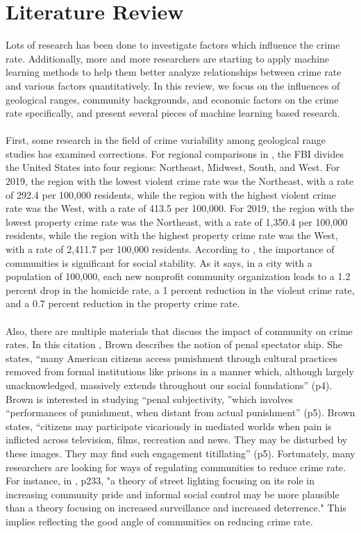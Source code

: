 \documentclass[letterpaper, 11 pt, conference]{article}
\begin{document}
\section{Literature Review}
Lots of research has been done to investigate factors which influence the crime rate. Additionally, more and more researchers are starting to apply machine learning methods to help them better analyze relationships between crime rate and various factors quantitatively. In this review, we focus on the influences of geological ranges, community backgrounds, and economic factors on the crime rate specifically, and present several pieces of machine learning based research. 
\\
\\First, some research in the field of crime variability among geological range studies has examined corrections. For regional comparisons in \cite{greenwade93}, the FBI divides the United States into four regions: Northeast, Midwest, South, and West. For 2019, the region with the lowest violent crime rate was the Northeast, with a rate of 292.4 per 100,000 residents, while the region with the highest violent crime rate was the West, with a rate of 413.5 per 100,000. For 2019, the region with the lowest property crime rate was the Northeast, with a rate of 1,350.4 per 100,000 residents, while the region with the highest property crime rate was the West, with a rate of 2,411.7 per 100,000 residents. According to \cite{ref1}, the importance of communities is significant for social stability. As it says, in a city with a population of 100,000, each new nonprofit community organization leads to a 1.2 percent drop in the homicide rate, a 1 percent reduction in the violent crime rate, and a 0.7 percent reduction in the property crime rate.
\\
\\Also, there are multiple materials that discuss the impact of community on crime rates. In this citation \cite{ref5}, Brown describes the notion of penal spectator ship. She states, “many American citizens access punishment through cultural practices removed from formal institutions like prisons in a manner which, although largely unacknowledged, massively extends throughout our social foundations” (p4). Brown is interested in studying “penal subjectivity, ”which involves “performances of punishment, when distant from actual punishment” (p5). Brown states, “citizens may participate vicariously in mediated worlds when pain is inflicted across television, films, recreation and news. They may be disturbed by these images. They may find such engagement titillating” (p5). Fortunately, many researchers are looking for ways of regulating communities to reduce crime rate. For instance, in \cite{ref2}, p233, "a theory of street lighting focusing on its role in increasing community pride and informal social control may be more plausible than a theory focusing on increased surveillance and increased deterrence." This implies reflecting the good angle of communities on reducing crime rate. 
\end{document}
